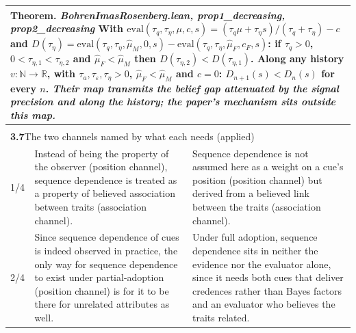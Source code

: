 \documentclass[10pt]{article}
\theoremstyle{definition}
\newlength{\fullw}\setlength{\fullw}{25.9cm}
\newcommand{\entryhead}[2]{\multicolumn{3}{|l|}{\rule{0pt}{2.6ex}\large\textbf{#1}\quad #2} \\ \hline}
\begin{document}
{\begin{longtable}{|p{0.9cm}|p{12.2cm}|p{12.2cm}|}
\multicolumn{3}{|p{\fullw}|}{\textbf{Theorem.} \textit{BohrenImasRosenberg.lean, prop1\_decreasing, prop2\_decreasing} \newline With $\mathrm{eval}(\tau_q,\tau_\eta,\mu,c,s) = (\tau_q\mu + \tau_\eta s)/(\tau_q+\tau_\eta) - c$ and $D(\tau_\eta) = \mathrm{eval}(\tau_q,\tau_\eta,\hat\mu_M,0,s) - \mathrm{eval}(\tau_q,\tau_\eta,\hat\mu_F,c_F,s)$: if $\tau_q > 0$, $0 < \tau_{\eta,1} < \tau_{\eta,2}$ and $\hat\mu_F < \hat\mu_M$ then $D(\tau_{\eta,2}) < D(\tau_{\eta,1})$. Along any history $v : \mathbb{N} \to \mathbb{R}$, with $\tau_a,\tau_\varepsilon,\tau_\eta > 0$, $\hat\mu_F < \hat\mu_M$ and $c = 0$: $D_{n+1}(s) < D_n(s)$ for every $n$. \newline \textit{Their map transmits the belief gap attenuated by the signal precision and along the history; the paper's mechanism sits outside this map.}} \\ \hline
\multicolumn{3}{|l|}{} \\ \hline
\entryhead{3.7}{The two channels named by what each needs (applied)\quad{\footnotesize\textit{(formerly C.23)}}}
1/4 & Instead of being the property of the observer (position channel), sequence dependence is treated as a property of believed association between traits (association channel). & Sequence dependence is not assumed here as a weight on a cue's position (position channel) but derived from a believed link between the traits (association channel). \\ \hline
2/4 & Since sequence dependence of cues is indeed observed in practice, the only way for sequence dependence to exist under partial-adoption (position channel) is for it to be there for unrelated attributes as well. & Under full adoption, sequence dependence sits in neither the evidence nor the evaluator alone, since it needs both cues that deliver credences rather than Bayes factors and an evaluator who believes the traits related. \\ \hline

\end{longtable}}
\end{document}
